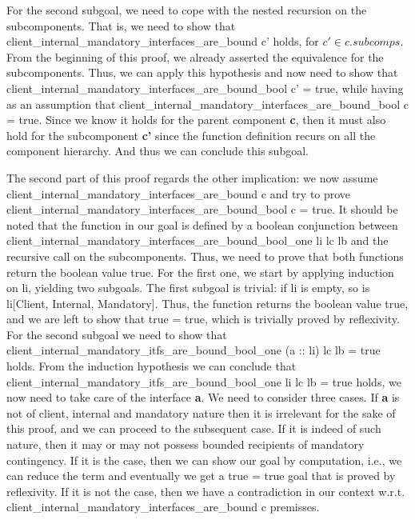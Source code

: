 \begin{lemma}
	  For the second subgoal, we need to cope with the nested recursion on the sub\textsf{component}s. That is,
	we need to show that \textsf{client_internal_mandatory_interfaces_are_bound c'} holds, for $c' \in c.subcomps$.	
	From the beginning of this proof, we already asserted the equivalence for the sub\textsf{component}s. Thus, we can apply this 
	hypothesis and now need to show that \textsf{client_internal_mandatory_interfaces_are_bound_bool c' = true}, while having as 
	an assumption that \textsf{client_internal_mandatory_interfaces_are_bound_bool c = true}. Since we know it holds for the
	parent \textsf{component} \textbf{c}, then it must also hold for the sub\textsf{component} \textbf{c'} since the function definition
	recurs on all the \textsf{component} hierarchy. And thus we can conclude this subgoal. 
			
	The second part of this proof regards	the other implication: we now assume
	\textsf{client_internal_mandatory_interfaces_are_bound c} and try to prove
	\textsf{client_internal_mandatory_interfaces_are_bound_bool c = true}.
	It should be noted that the function in our goal is defined by a boolean conjunction
	between \textsf{client_internal_mandatory_interfaces_are_bound_bool_one li lc lb} and
	the recursive call on the sub\textsf{component}s.	Thus, we need to prove that both functions return
	the boolean value true. For the first one, we start by applying induction on \textsf{li}, yielding two subgoals.
	The first subgoal is trivial: if \textsf{li} is empty, so is \textsf{li[Client, Internal, Mandatory]}. Thus, the function
	returns the boolean value true, and we are left to show that \textsf{true = true}, which is trivially proved by reflexivity.
	For the second subgoal we need to show that 
	\textsf{client_internal_mandatory_itfs_are_bound_bool_one (a :: li) lc lb = true} holds. From the induction hypothesis
	we can conclude that \textsf{client_internal_mandatory_itfs_are_bound_bool_one li lc lb = true} holds,
	we now need to take care of the \textsf{interface} \textbf{a}. We need to consider three cases.
	If \textbf{a} is not of \textsf{client},
	\textsf{internal} and \textsf{mandatory} nature then it is irrelevant for the sake of this proof, and we can
	proceed to the subsequent case. If it is indeed of such nature, then it may or may not possess bounded recipients
	of \textsf{mandatory} \textsf{contingency}. If it is the case, then we can show our goal by computation, i.e.,
	we can reduce the term and eventually we get a \textsf{true = true} goal that is proved by reflexivity.
	If it is not the case, then we have a contradiction in our context w.r.t. 
	\textsf{client_internal_mandatory_interfaces_are_bound c} premisses.
	

\end{lemma}
